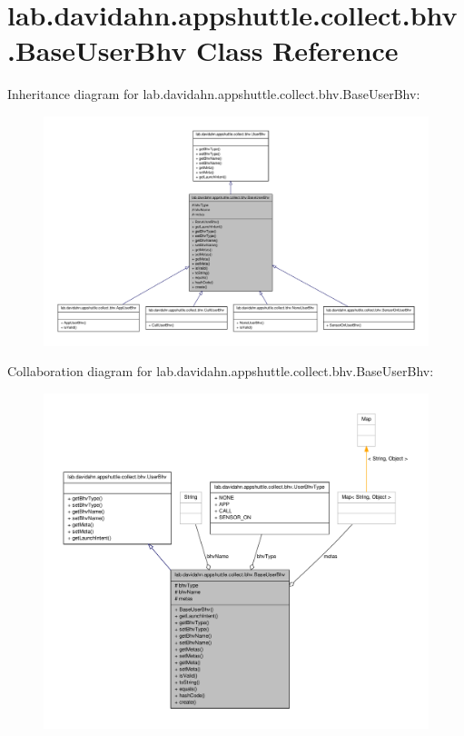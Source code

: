 \hypertarget{classlab_1_1davidahn_1_1appshuttle_1_1collect_1_1bhv_1_1_base_user_bhv}{\section{lab.\-davidahn.\-appshuttle.\-collect.\-bhv.\-Base\-User\-Bhv \-Class \-Reference}
\label{classlab_1_1davidahn_1_1appshuttle_1_1collect_1_1bhv_1_1_base_user_bhv}
}


\-Inheritance diagram for lab.\-davidahn.\-appshuttle.\-collect.\-bhv.\-Base\-User\-Bhv\-:
\nopagebreak
\begin{figure}[H]
\begin{center}
\leavevmode
\includegraphics[width=350pt]{classlab_1_1davidahn_1_1appshuttle_1_1collect_1_1bhv_1_1_base_user_bhv__inherit__graph}
\end{center}
\end{figure}


\-Collaboration diagram for lab.\-davidahn.\-appshuttle.\-collect.\-bhv.\-Base\-User\-Bhv\-:
\nopagebreak
\begin{figure}[H]
\begin{center}
\leavevmode
\includegraphics[width=350pt]{classlab_1_1davidahn_1_1appshuttle_1_1collect_1_1bhv_1_1_base_user_bhv__coll__graph}
\end{center}
\end{figure}
